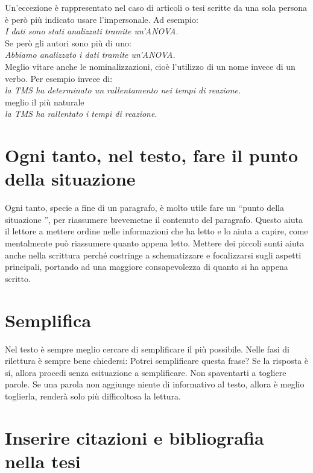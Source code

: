 \documentclass[12pt]{book}
\newcommand{\oq}{``} %
\newcommand{\cq}{''} %
\begin{document}
 Un'eccezione è rappresentato nel caso di articoli o tesi scritte da una sola persona è però più indicato usare l'impersonale. Ad esempio: \\\newline
\indent \emph{I dati sono stati analizzati tramite un'ANOVA.}\\\newline
Se però gli autori sono più di uno: \\\newline
\indent \emph{Abbiamo analizzato i dati tramite un'ANOVA.}\\

Meglio vitare anche le nominalizzazioni, cioè l'utilizzo di un nome invece di un verbo. Per esempio invece di: \\\newline
\indent \emph{la TMS ha determinato un rallentamento nei tempi di reazione.}\\\newline
meglio il più naturale \\\newline
\indent \emph{la TMS ha rallentato i tempi di reazione}.


\section{Ogni tanto, nel testo, fare il punto della situazione}
Ogni tanto, specie a fine di un paragrafo, è molto utile fare un \oq punto della situazione \cq, per riassumere brevemetne il contenuto del paragrafo. Questo aiuta il lettore a mettere ordine nelle informazioni che ha letto e lo aiuta a capire, come mentalmente può riassumere quanto appena letto. Mettere dei piccoli sunti aiuta anche nella scrittura perché costringe a schematizzare e focalizzarsi sugli aspetti principali, portando ad una maggiore consapevolezza di quanto si ha appena scritto. 


\section{Semplifica}
Nel testo è sempre meglio cercare di semplificare il più possibile. Nelle fasi di rilettura è sempre bene chiedersi: Potrei semplificare questa frase? Se la risposta è s\'i, allora procedi senza esituazione a semplificare. Non spaventarti a togliere parole. Se una parola non aggiunge niente di informativo al testo, allora è meglio toglierla, renderà solo più difficoltosa la lettura.

\section{Inserire citazioni e bibliografia nella tesi}
\end{document}
